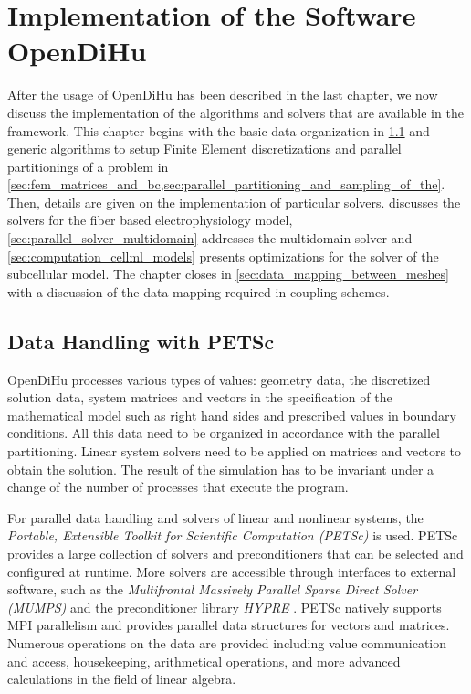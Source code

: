 \chapter{Implementation of the Software OpenDiHu}\label{sec:implementation}

After the usage of OpenDiHu has been described in the last chapter, we now discuss the implementation of the algorithms and solvers that are available in the framework. This chapter begins with the basic data organization in \cref{sec:data_handling_with_petsc} and generic algorithms to setup Finite Element discretizations and parallel partitionings of a problem in \cref{sec:fem_matrices_and_bc,sec:parallel_partitioning_and_sampling_of_the}. Then, details are given on the implementation of particular solvers.  discusses the solvers for the fiber based electrophysiology model, \cref{sec:parallel_solver_multidomain} addresses the multidomain solver and \cref{sec:computation_cellml_models} presents optimizations for the solver of the subcellular model. The chapter closes in \cref{sec:data_mapping_between_meshes} with a discussion of the data mapping required in coupling schemes.

\section{Data Handling with PETSc}\label{sec:data_handling_with_petsc}

OpenDiHu processes various types of values: geometry data, the discretized solution data, system matrices and vectors in the specification of the mathematical model such as right hand sides and prescribed values in boundary conditions.
All this data need to be organized in accordance with the parallel partitioning. Linear system solvers need to be applied on matrices and vectors to obtain the solution.
The result of the simulation has to be invariant under a change of the number of processes that execute the program.

For parallel data handling and solvers of linear and nonlinear systems, the \emph{Portable, Extensible Toolkit for Scientific Computation (PETSc)} \cite{petsc-web-page,petsc-user-ref,petsc-efficient} is used. PETSc provides a large collection of solvers and preconditioners that can be selected and configured at runtime. More solvers are accessible through interfaces to external software, such as the \emph{Multifrontal Massively Parallel Sparse Direct Solver (MUMPS)} \cite{mumps2001,mumps2019} and the preconditioner library \emph{HYPRE} \cite{falgout2002hypre}. PETSc natively supports MPI parallelism and provides parallel data structures for vectors and matrices. Numerous operations on the data are provided including value communication and access, housekeeping, arithmetical operations, and more advanced calculations in the field of linear algebra.

